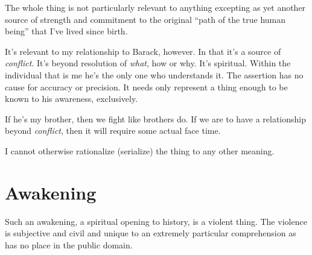 \documentclass[12pt,twocolumn]{article}
\begin{document}
The whole thing is not particularly relevant to anything excepting as
yet another source of strength and commitment to the original ``path
of the true human being'' that I've lived since birth.  

It's relevant to my relationship to Barack, however.  In that it's a
source of {\it conflict}.  It's beyond resolution of {\it what}, how
or why.  It's spiritual.  Within the individual that is me he's the
only one who understands it.  The assertion has no cause for accuracy
or precision.  It needs only represent a thing enough to be known to
his awareness, exclusively.

If he's my brother, then we fight like brothers do.  If we are to have
a relationship beyond {\it conflict}, then it will require some actual
face time.

I cannot otherwise rationalize (serialize) the thing to any other
meaning.

\section{Awakening}

Such an awakening, a spiritual opening to history, is a violent thing.
The violence is subjective and civil and unique to an extremely
particular comprehension as has no place in the public domain.
\end{document}
